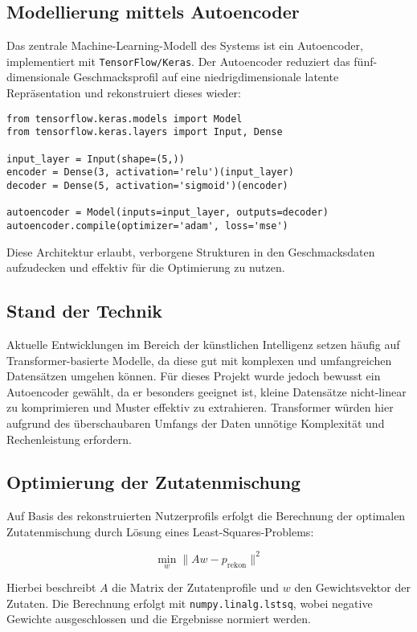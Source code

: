 \documentclass[a4paper,12pt]{article}
\begin{document}
\subsection{Modellierung mittels Autoencoder}
Das zentrale Machine-Learning-Modell des Systems ist ein Autoencoder, implementiert mit \texttt{TensorFlow/Keras}. Der Autoencoder reduziert das fünf-dimensionale Geschmacksprofil auf eine niedrigdimensionale latente Repräsentation und rekonstruiert dieses wieder:

\begin{verbatim}
from tensorflow.keras.models import Model
from tensorflow.keras.layers import Input, Dense

input_layer = Input(shape=(5,))
encoder = Dense(3, activation='relu')(input_layer)
decoder = Dense(5, activation='sigmoid')(encoder)

autoencoder = Model(inputs=input_layer, outputs=decoder)
autoencoder.compile(optimizer='adam', loss='mse')
\end{verbatim}

Diese Architektur erlaubt, verborgene Strukturen in den Geschmacksdaten aufzudecken und effektiv für die Optimierung zu nutzen.

\subsection{Stand der Technik}
Aktuelle Entwicklungen im Bereich der künstlichen Intelligenz setzen häufig auf Transformer-basierte Modelle, da diese gut mit komplexen und umfangreichen Datensätzen umgehen können. Für dieses Projekt wurde jedoch bewusst ein Autoencoder gewählt, da er besonders geeignet ist, kleine Datensätze nicht-linear zu komprimieren und Muster effektiv zu extrahieren. Transformer würden hier aufgrund des überschaubaren Umfangs der Daten unnötige Komplexität und Rechenleistung erfordern.

\subsection{Optimierung der Zutatenmischung}
Auf Basis des rekonstruierten Nutzerprofils erfolgt die Berechnung der optimalen Zutatenmischung durch Lösung eines Least-Squares-Problems:

\begin{equation}
\min_{w} \| A w - p_{\text{rekon}} \|^2
\end{equation}

Hierbei beschreibt $A$ die Matrix der Zutatenprofile und $w$ den Gewichtsvektor der Zutaten. Die Berechnung erfolgt mit \texttt{numpy.linalg.lstsq}, wobei negative Gewichte ausgeschlossen und die Ergebnisse normiert werden.
\end{document}
